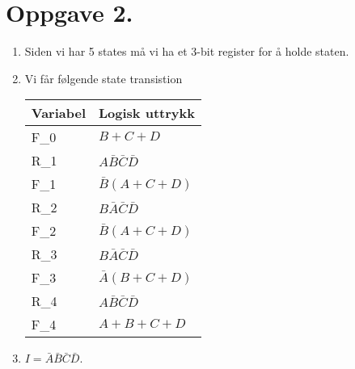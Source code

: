 \documentclass[a4paper,11pt,norsk]{article}
\begin{document}
\section*{Oppgave 2.}
\begin{enumerate}
    \item Siden vi har 5 states må vi ha et 3-bit register for å holde staten.
    \item Vi får følgende state transistion
        \begin{table}[H]
            \centering
            \begin{tabular}{|l|l|}
                \hline 
                \hline
                \textbf{Variabel} & \textbf{Logisk uttrykk} \\
                \hline
                F_0 & $B + C + D$ \\
                R_1 & $A\bar{B}\bar{C}\bar{D}$ \\
                F_1 & $\bar{B}(A + C + D)$ \\
                R_2 & $B\bar{A}\bar{C}\bar{D}$ \\
                F_2 & $\bar{B}(A + C + D)$ \\
                R_3 & $B\bar{A}\bar{C}\bar{D}$ \\
                F_3 & $\bar{A}(B + C + D)$ \\
                R_4 & $A\bar{B}\bar{C}\bar{D}$ \\
                F_4 & $A + B + C + D$ \\
                \hline
            \end{tabular}
        \end{table}
    \item $I = \bar{A}\bar{B}\bar{C}\bar{D}$.
\end{enumerate}
\end{document}
